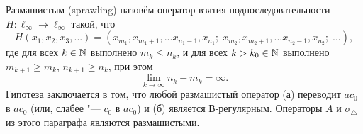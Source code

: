 \begin{hypothesis}
	Размашистым (sprawling)
	назовём оператор взятия подпоследовательности $H:\ell_\infty \to \ell_\infty$ такой, что
	\begin{equation}
		H(x_1,x_2, x_3, ...) =
		(
		x_{m_1},x_{m_1+1},...x_{n_1-1},x_{n_1};\;
		x_{m_2},x_{m_2+1},...x_{n_2-1},x_{n_2};\;
		...)
		,
	\end{equation}
	где для всех $k\in\mathbb{N}$ выполнено $m_k\leq n_k$,
	и для всех $k > k_0 \in \mathbb{N}$ выполнено
	$m_{k+1} \geq m_k$, $n_{k+1} \geq n_k$,
	при этом
	\begin{equation}
		\lim_{k\to\infty} n_k - m_k = \infty
		.
	\end{equation}
	Гипотеза заключается в том, что любой размашистый оператор
	(а) переводит $ac_0$ в $ac_0$ (или, слабее "--- $c_0$ в $ac_0$) и
	(б) является В-регулярным.
	Операторы $A$ и $\sigma_\triangle$ из этого параграфа являются размашистыми.
\end{hypothesis}
